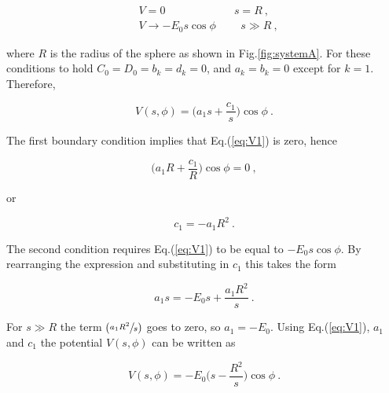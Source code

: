 \documentclass[a4paper]{jpconf}
\begin{document}
\begin{subequations}
\begin{align}
&V = 0  \hspace{75pt} s = R~,\\ 
&V \to -E_0 s \cos{\phi} \hspace{27pt} s \gg R~,
\end{align}
\end{subequations}

\noindent where $R$ is the radius of the sphere as shown in Fig.\ref{fig:systemA}. For these conditions to hold $C_0 = D_0 = b_k = d_k=0$, and $a_k = b_k=0$ except for $k=1$. Therefore,

\begin{equation}
V(s,\phi) = \bigg( a_1 s + \frac{c_1}{s}\bigg) \cos{\phi}~.
\label{eq:V1}
\end{equation}

The first boundary condition implies that Eq.(\ref{eq:V1}) is zero, hence

\begin{equation}
\bigg( a_1 R + \frac{c_1}{R}\bigg) \cos{\phi} = 0~,
\end{equation} 

\noindent or 

\begin{equation}
c_1 = - a_1 R^2 ~.
\end{equation}

\noindent The second condition requires Eq.(\ref{eq:V1}) to be equal to $-E_0 s \cos{\phi}$. By rearranging the expression and substituting in $c_1$ this takes the form

\begin{equation}
a_1 s = -E_0 s + \frac{a_1 R^2}{s}~.
\end{equation}

\noindent For $s \gg R$ the term $(\sfrac{a_1 R^2}{s})$ goes to zero, so $a_1 = -E_0$.
Using Eq.(\ref{eq:V1}), $a_1$ and $c_1$ the potential $V(s,\phi)$ can be written as

\begin{equation}
V(s,\phi) = - E_0 \bigg(s - \frac{R^2}{s}\bigg) \cos{\phi}~.
\label{eq:V2}
\end{equation}
\end{document}
